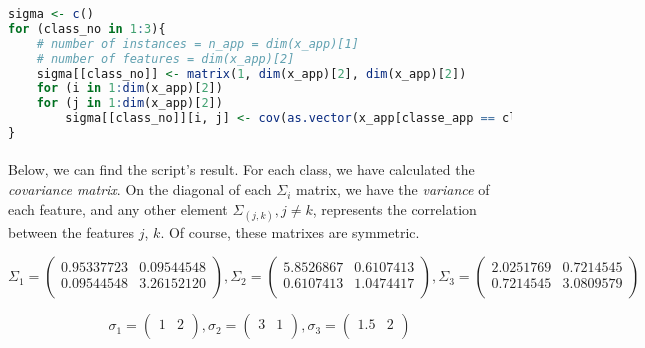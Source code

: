 \begin{lstlisting}[language=R, caption=Calculating covariance]
sigma <- c()
for (class_no in 1:3){
    # number of instances = n_app = dim(x_app)[1]
    # number of features = dim(x_app)[2]
    sigma[[class_no]] <- matrix(1, dim(x_app)[2], dim(x_app)[2])
    for (i in 1:dim(x_app)[2])
    for (j in 1:dim(x_app)[2])
        sigma[[class_no]][i, j] <- cov(as.vector(x_app[classe_app == class_no, i]), as.vector (x_app[classe_app == class_no, j]))
}
\end{lstlisting}

\paragraph{}
Below, we can find the script's result. For each class, we have calculated the \emph{covariance matrix}.
On the diagonal of each ${\Sigma}_i$ matrix, we have the \emph{variance} of each feature, and any other element ${\Sigma}_(j, k), j \neq k$, represents the correlation between the features $j$, $k$.
Of course, these matrixes are symmetric.

\[ 
    {\Sigma}_1 = 
    \left(\begin{array}{cc}
    0.95337723 & 0.09544548 \\
    0.09544548 & 3.26152120 \\
    \end{array} \right)
    ,
    {\Sigma}_2 = 
    \left( \begin{array}{cc}
    5.8526867 & 0.6107413 \\
    0.6107413 & 1.0474417 \\
    \end{array} \right)
    ,
    {\Sigma}_3 = 
    \left( \begin{array}{cc}
    2.0251769 & 0.7214545 \\
    0.7214545 & 3.0809579 \\
    \end{array} \right)
\]

\[ 
    {\sigma}_1 = 
    \left(\begin{array}{cc}
    1 & 2 \\
    \end{array} \right)
    ,
    {\sigma}_2 = 
    \left( \begin{array}{cc}
    3 & 1 \\
    \end{array} \right)
    ,
    {\sigma}_3 = 
    \left( \begin{array}{cc}
    1.5 & 2 \\
    \end{array} \right)
\]

